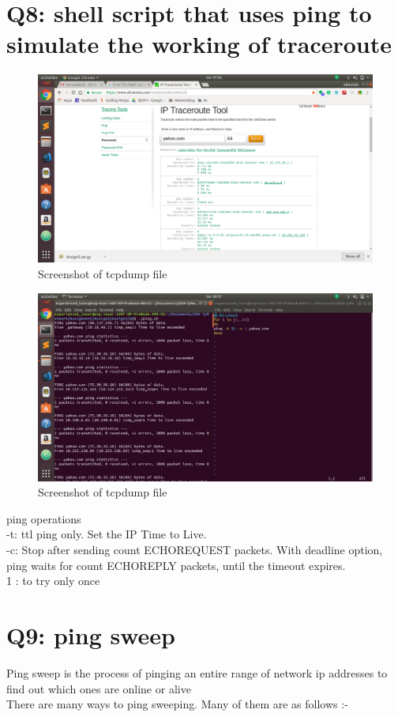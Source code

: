 \documentclass{article}
\begin{document}
\section{Q8: shell script that uses ping to simulate the working of traceroute}
    \begin{figure}[H]
 \centering
 \includegraphics[width=1.0\textwidth]{Assign3/q8/q8a.png}
 \caption{\label{fig:PING}Screenshot of tcpdump file}
 \end{figure}
 
    \begin{figure}[H]
 \centering
 \includegraphics[width=1.0\textwidth]{Assign3/q8/q8b.png}
 \caption{\label{fig:PING}Screenshot of tcpdump file}
 \end{figure}
 ping operations \\
 -t: ttl ping only.  Set the IP Time to Live.\\
 -c: Stop  after  sending  count  ECHOREQUEST packets. With deadline option, ping waits        for count ECHOREPLY packets, until the timeout expires.\\
 1 : to try only once
\section{Q9: ping sweep}
Ping sweep is the process of pinging an entire range of network ip addresses to find out which ones are online or alive\\
There are many ways to ping sweeping. Many of them are as follows :-
\end{document}
